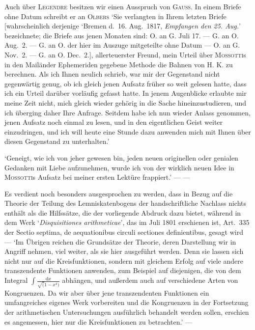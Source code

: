 
Auch über \textsc{Legendre} besitzen wir einen Ausspruch von \textsc{Gauss}. In einem Briefe ohne Datum schreibt er an \textsc{Olbers} ‘Sie verlangten in Ihrem letzten Briefe [wahrscheinlich derjenige ‘Bremen d.\ 16. Aug.\ 1817, \textit{Empfangen den 25. Aug.}’ bezeichnete; die Briefe aus jenen Monaten sind: O. an G. Juli 17. --- G. an O. Aug.\ 2. --- G. an O. der hier im Auszuge mitgeteilte ohne Datum --- O. an G. Nov.\ 2. --- G. an O. Dec.\ 2.], allerteuerster Freund, mein Urteil über \textsc{Mossotti}s in den Mailänder Ephemeriden gegebene Methode die Bahnen von H. K. zu berechnen. Als ich Ihnen neulich schrieb, war mir der Gegenstand nicht gegenwärtig genug, ob ich gleich jenen Aufsatz früher so weit gelesen hatte, dass ich ein Urteil darüber vorläufig gefasst hatte. In jenem Augenblicke erlaubte mir meine Zeit nicht, mich gleich wieder gehörig in die Sache hineinzustudieren, und ich überging daher Ihre Anfrage. Seitdem habe ich nun wieder Anlass genommen, jenen Aufsatz noch einmal zu lesen, und in den eigentlichen Geist weiter einzudringen, und ich will heute eine Stunde dazu anwenden mich mit Ihnen über diesen Gegenstand zu unterhalten.’

‘Geneigt, wie ich von jeher gewesen bin, jeden neuen originellen oder genialen Gedanken mit Liebe aufzunehmen, wurde ich von der wirklich neuen Idee in \textsc{Mossotti}s Aufsatz bei meiner ersten Lektüre frappiert.’ --- ---

\medskip


\medskip
Es verdient noch besonders ausgesprochen zu werden, dass in Bezug auf die Theorie der Teilung des Lemniskatenbogens der handschriftliche Nachlass nichts enthält als die Hilfssätze, die der vorliegende Abdruck dazu bietet, während in dem Werk ‘\textit{Disquisitiones arithmeticae}’, das im Juli 1801 erschienen ist, Art.\ 335 der Sectio septima, de aequationibus circuli sectiones definientibus, gesagt wird --- ‘Im Übrigen reichen die Grundsätze der Theorie, deren Darstellung wir in Angriff nehmen, viel weiter, als sie hier ausgeführt werden. Denn sie lassen sich nicht nur auf die Kreisfunktionen, sondern mit gleichem Erfolg auf viele andere transzendente Funktionen anwenden, zum Beispiel auf diejenigen, die von dem Integral \(\displaystyle\int\frac{\mathrm{d}x}{\surd(1-x^{4})}\) abhängen, und außerdem auch auf verschiedene Arten von Kongruenzen. Da wir aber über jene transzendenten Funktionen ein umfangreiches eigenes Werk vorbereiten und die Kongruenzen in der Fortsetzung der arithmetischen Untersuchungen ausführlich behandelt werden sollen, erschien es angemessen, hier nur die Kreisfunktionen zu betrachten.’ ---

